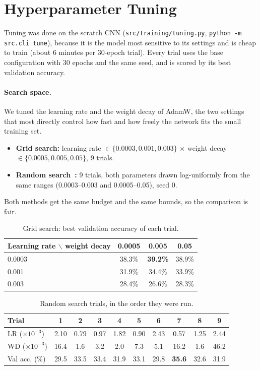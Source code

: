 \documentclass[11pt,a4paper]{article}
\begin{document}
\section{Hyperparameter Tuning}
\label{sec:tuning}

Tuning was done on the scratch CNN (\texttt{src/training/tuning.py},
\texttt{python -m src.cli tune}), because it is the model most sensitive to its
settings and is cheap to train (about 6 minutes per 30-epoch trial). Every
trial uses the base configuration with 30 epochs and the same seed, and is
scored by its best validation accuracy.

\paragraph{Search space.} We tuned the learning rate and the weight decay of
AdamW, the two settings that most directly control how fast and how freely the
network fits the small training set.
\begin{itemize}
  \item \textbf{Grid search:} learning rate $\in \{0.0003, 0.001, 0.003\}$
        $\times$ weight decay $\in \{0.0005, 0.005, 0.05\}$, 9 trials.
  \item \textbf{Random search~\cite{bergstra2012}:} 9 trials, both parameters
        drawn log-uniformly from the same ranges (0.0003--0.003 and
        0.0005--0.05), seed 0.
\end{itemize}
Both methods get the same budget and the same bounds, so the comparison is fair.

\begin{table}[H]
\centering
\caption{Grid search: best validation accuracy of each trial.}
\label{tab:grid}
\begin{tabular}{lccc}
\toprule
Learning rate $\backslash$ weight decay & 0.0005 & 0.005 & 0.05 \\
\midrule
0.0003 & 38.3\% & \textbf{39.2\%} & 38.9\% \\
0.001 & 31.9\% & 34.4\% & 33.9\% \\
0.003 & 28.4\% & 26.6\% & 28.3\% \\
\bottomrule
\end{tabular}
\end{table}

\begin{table}[H]
\centering
\caption{Random search trials, in the order they were run.}
\label{tab:random}
\begin{tabular}{lccccccccc}
\toprule
Trial & 1 & 2 & 3 & 4 & 5 & 6 & 7 & 8 & 9 \\
\midrule
LR ($\times 10^{-3}$) & 2.10 & 0.79 & 0.97 & 1.82 & 0.90 & 2.43 & 0.57 & 1.25 & 2.44 \\
WD ($\times 10^{-3}$) & 16.4 & 1.6 & 3.2 & 2.0 & 7.3 & 5.1 & 16.2 & 1.6 & 46.2 \\
Val acc. (\%) & 29.5 & 33.5 & 33.4 & 31.9 & 33.1 & 29.8 & \textbf{35.6} & 32.6 & 31.9 \\
\bottomrule
\end{tabular}
\end{table}
\end{document}
